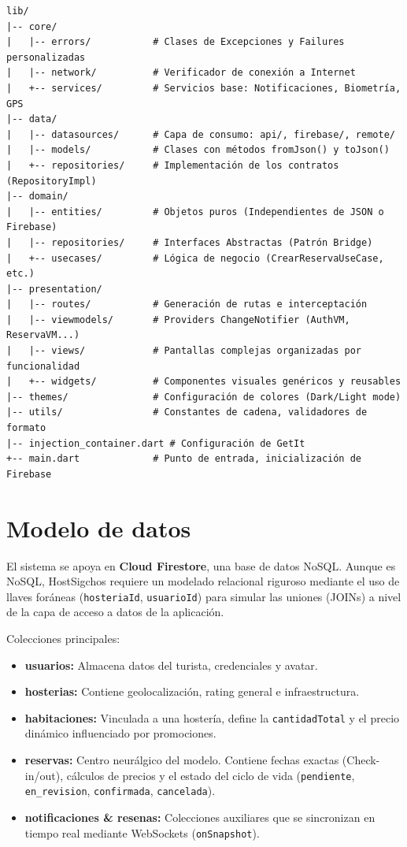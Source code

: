 \documentclass{article}
\begin{document}
\begin{tcolorbox}[title=Estructura modular en lib/]
\begin{verbatim}
lib/
|-- core/
|   |-- errors/           # Clases de Excepciones y Failures personalizadas
|   |-- network/          # Verificador de conexión a Internet
|   +-- services/         # Servicios base: Notificaciones, Biometría, GPS
|-- data/
|   |-- datasources/      # Capa de consumo: api/, firebase/, remote/
|   |-- models/           # Clases con métodos fromJson() y toJson()
|   +-- repositories/     # Implementación de los contratos (RepositoryImpl)
|-- domain/
|   |-- entities/         # Objetos puros (Independientes de JSON o Firebase)
|   |-- repositories/     # Interfaces Abstractas (Patrón Bridge)
|   +-- usecases/         # Lógica de negocio (CrearReservaUseCase, etc.)
|-- presentation/
|   |-- routes/           # Generación de rutas e interceptación
|   |-- viewmodels/       # Providers ChangeNotifier (AuthVM, ReservaVM...)
|   |-- views/            # Pantallas complejas organizadas por funcionalidad
|   +-- widgets/          # Componentes visuales genéricos y reusables
|-- themes/               # Configuración de colores (Dark/Light mode)
|-- utils/                # Constantes de cadena, validadores de formato
|-- injection_container.dart # Configuración de GetIt
+-- main.dart             # Punto de entrada, inicialización de Firebase
\end{verbatim}
\end{tcolorbox}

\section{Modelo de datos}
El sistema se apoya en \textbf{Cloud Firestore}, una base de datos NoSQL. Aunque es NoSQL, HostSigchos requiere un modelado relacional riguroso mediante el uso de llaves foráneas (\texttt{hosteriaId}, \texttt{usuarioId}) para simular las uniones (JOINs) a nivel de la capa de acceso a datos de la aplicación.

Colecciones principales:
\begin{itemize}[label=\small\color{verdeO}$\blacksquare$]
    \item \textbf{usuarios:} Almacena datos del turista, credenciales y avatar.
    \item \textbf{hosterias:} Contiene geolocalización, rating general e infraestructura.
    \item \textbf{habitaciones:} Vinculada a una hostería, define la \texttt{cantidadTotal} y el precio dinámico influenciado por promociones.
    \item \textbf{reservas:} Centro neurálgico del modelo. Contiene fechas exactas (Check-in/out), cálculos de precios y el estado del ciclo de vida (\texttt{pendiente}, \texttt{en\_revision}, \texttt{confirmada}, \texttt{cancelada}).
    \item \textbf{notificaciones \& resenas:} Colecciones auxiliares que se sincronizan en tiempo real mediante WebSockets (\texttt{onSnapshot}).
\end{itemize}
\end{document}
